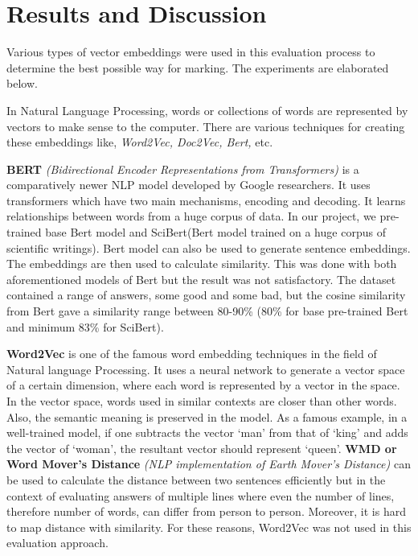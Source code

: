 \chapter{Results and Discussion}
\label{C4} %

\par
Various types of vector embeddings were used in this evaluation process to determine the best possible way for marking. The experiments are elaborated below. \\
\par
In Natural Language Processing, words or collections of words are represented by vectors to make sense to the computer. There are various techniques for creating these embeddings like, \textit{Word2Vec, Doc2Vec, Bert,} etc. \\
\par
\textbf{BERT} \textit{(Bidirectional Encoder Representations from Transformers)} is a comparatively newer NLP model developed by Google researchers. It uses transformers which have two main mechanisms, encoding and decoding. It learns relationships between words from a huge corpus of data. In our project, we pre-trained base Bert model and SciBert(Bert model trained on a huge corpus of scientific writings). Bert model can also be used to generate sentence embeddings. The embeddings are then used to calculate similarity. This was done with both aforementioned models of Bert but the result was not satisfactory. The dataset contained a range of answers, some good and some bad, but the cosine similarity from Bert gave a similarity range between 80-90\% (80\% for base pre-trained Bert and minimum 83\% for SciBert). \\
\par
\textbf{Word2Vec} is one of the famous word embedding techniques in the field of Natural language Processing. It uses a neural network to generate a vector space of a certain dimension, where each word is represented by a vector in the space. In the vector space, words used in similar contexts are closer than other words. Also, the semantic meaning is preserved in the model. As a famous example, in a well-trained model, if one subtracts the vector ‘man’ from that of ‘king’ and adds the vector of ‘woman’, the resultant vector should represent ‘queen’. \textbf{WMD or Word Mover’s Distance} \textit{(NLP implementation of Earth Mover’s Distance)} can be used to calculate the distance between two sentences efficiently but in the context of evaluating answers of multiple lines where even the number of lines, therefore number of words, can differ from person to person. Moreover, it is hard to map distance with similarity. For these reasons, Word2Vec was not used in this evaluation approach. \\
